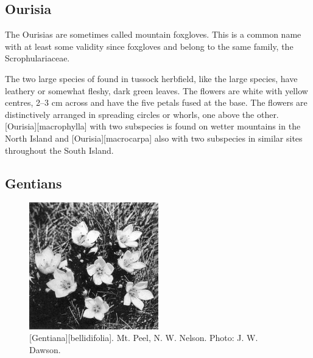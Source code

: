 \subsection{Ourisia}

The Ourisias are sometimes called mountain foxgloves.
This is a common name with at least some validity since foxgloves and  belong to the same family, the Scrophulariaceae.

The two large species of  found in tussock herbfield, like the large  species, have leathery or somewhat fleshy, dark green leaves.
The flowers are white with yellow centres, 2--3 cm across and have the five petals fused at the base.
The flowers are distinctively arranged in spreading circles or whorls, one above the other. [Ourisia][macrophylla] with two subspecies is found on wetter mountains in the North Island and [Ourisia][macrocarpa] also with two subspecies in similar sites throughout the South Island.

\subsection{Gentians}

\begin{figure}
	\includegraphics[width=0.5\textwidth]{graphics/figure101gentiana.jpg}
	\centering
	\caption[\emph{Gentiana bellidifolia}]{[Gentiana][bellidifolia].
	Mt. Peel,  N. W. Nelson.
	Photo: J. W. Dawson.}%
	\label{fig:101gentiana}
\end{figure}

